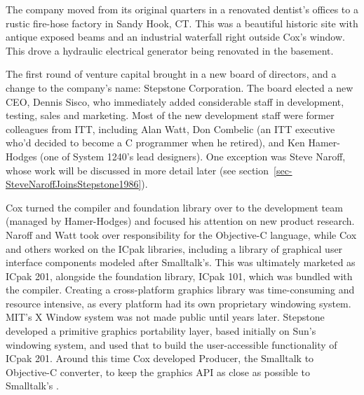 \documentclass[acmsmall]{acmart}\settopmatter{}
\begin{document}
The company moved from its original quarters in a renovated dentist's offices to a rustic fire-hose factory in Sandy Hook, CT. This was a beautiful historic site with antique exposed beams and an industrial waterfall right outside Cox's window. This drove a hydraulic electrical generator being renovated in the basement. 

The first round of venture capital brought in a new board of directors, and a change to the company's name: Stepstone Corporation. The board elected a new CEO, Dennis Sisco, who immediately added considerable staff in development, testing, sales and marketing. Most of the new development staff were former colleagues from ITT, including Alan Watt, Don Combelic (an ITT executive who'd decided to become a C programmer when he retired), and Ken Hamer-Hodges (one of System 1240's lead designers). One exception was Steve Naroff, whose work will be discussed in more detail later (see section~\ref{sec-SteveNaroffJoinsStepstone1986}).

Cox turned the compiler and foundation library over to the development team (managed by Hamer-Hodges) and focused his attention on new product research. Naroff and Watt took over responsibility for the Objective-C language, while Cox and others worked on the ICpak libraries, including a library of graphical user interface components modeled after Smalltalk's. This was ultimately marketed as ICpak 201, alongside the foundation library, ICpak 101, which was bundled with the compiler. Creating a cross-platform graphics library was time-consuming and resource intensive, as every platform had its own proprietary windowing system. MIT's X Window system was not made public until years later. Stepstone developed a primitive graphics portability layer, based initially on Sun's windowing system, and used that to build the user-accessible functionality of ICpak 201. Around this time Cox developed Producer, the Smalltalk to Objective-C converter, to keep the graphics API as close as possible to Smalltalk's  \citep{cox_producer:_1987}.
\end{document}
